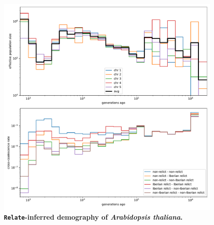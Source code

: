 \documentclass[12pt]{article}
\begin{document}
\begin{figure}[!htb]

\includegraphics[width=\textwidth]{plots/effective-population-sizes.pdf}

\caption{
\textbf{\texttt{Relate}-inferred demography of \textit{Arabidopsis thaliana}.}
}

\label{fig:nes}
\end{figure}
\end{document}
